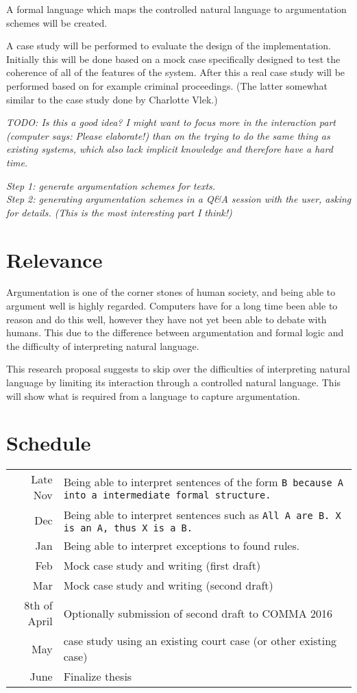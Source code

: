 \documentclass{article}
\begin{document}
A formal language which maps the controlled natural language to argumentation schemes will be created.

A case study will be performed to evaluate the design of the implementation. Initially this will be done based on a mock case specifically designed to test the coherence of all of the features of the system. After this a real case study will be performed based on for example criminal proceedings. (The latter somewhat similar to the case study done by Charlotte Vlek.)

\emph{TODO: Is this a good idea? I might want to focus more in the interaction part (computer says: Please elaborate!) than on the trying to do the same thing as existing systems, which also lack implicit knowledge and therefore have a hard time.}

\emph{Step 1: generate argumentation schemes for texts.}\\
\emph{Step 2: generating argumentation schemes in a Q\&A session with the user, asking for details. (This is the most interesting part I think!)}

\section{Relevance}
Argumentation is one of the corner stones of human society, and being able to argument well is highly regarded. Computers have for a long time been able to reason and do this well, however they have not yet been able to debate with humans. This due to the difference between argumentation and formal logic and the difficulty of interpreting natural language.

This research proposal suggests to skip over the difficulties of interpreting natural language by limiting its interaction through a controlled natural language. This will show what is required from a language to capture argumentation.

\section{Schedule}
\begin{tabularx}{\linewidth}{r|X}
    Late Nov & Being able to interpret sentences of the form \tt{B because A} into a intermediate formal structure.\\
    Dec & Being able to interpret sentences such as \tt{All A are B. X is an A, thus X is a B.} \\
    Jan & Being able to interpret exceptions to found rules.\\
    Feb & Mock case study and writing (first draft)\\
    Mar & Mock case study and writing (second draft)\\
    8th of April & Optionally submission of second draft to COMMA 2016\\
    May  & case study using an existing court case (or other existing case)\\
    June & Finalize thesis\\
\end{tabularx}
\end{document}
